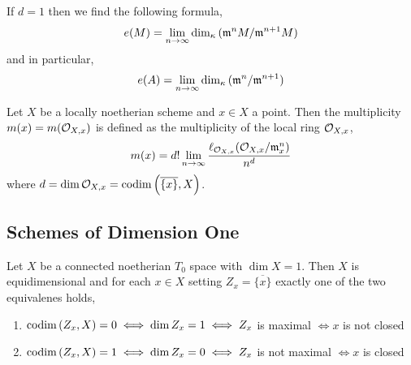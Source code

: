 \documentclass[12pt]{article}
\begin{document}
\begin{rmk}
If $d = 1$ then we find the following formula,
\[ e(M) =  \lim_{n \to \infty} \dim_\kappa{(\mathfrak{m}^n M / \mathfrak{m}^{n+1} M)} \]
and in particular,
\[ e(A) = \lim_{n \to \infty} \dim_\kappa{(\mathfrak{m}^n / \mathfrak{m}^{n+1})} \]
\end{rmk}

\begin{defn}
Let $X$ be a locally noetherian scheme and $x \in X$ a point. Then the multiplicity $m(x) = m(\mathcal{O}_{X, x})$ is defined as the multiplicity of the local ring $\mathcal{O}_{X, x}$,
\[ m(x) = d! \lim_{n \to \infty} \frac{\ell_{\mathcal{O}_{X, x}}(\mathcal{O}_{X, x} / \mathfrak{m}_x^n)}{n^{d}} \]
where $d = \dim{\mathcal{O}_{X, x}} = \mathrm{codim}\left( \overline{ \{ x \} }, X \right)$. 
\end{defn}


\subsection{Schemes of Dimension One}

\begin{prop}
Let $X$ be a connected noetherian $T_0$ space with $\dim{X} = 1$. Then $X$ is equidimensional and for each $x \in X$ setting $Z_x = \overline{ \{ x \} }$ exactly one of the two equivalenes holds,
\begin{enumerate}
\item $\mathrm{codim}\left( Z_x, X \right) = 0 \iff \dim{Z_x} = 1 \iff Z_x$ is maximal $\iff x $ is not closed
\item $\mathrm{codim}\left( Z_x, X \right) = 1 \iff \dim{Z_x} = 0 \iff Z_x$ is not maximal $\iff x$ is closed
\end{enumerate}
\end{prop}
\end{document}
